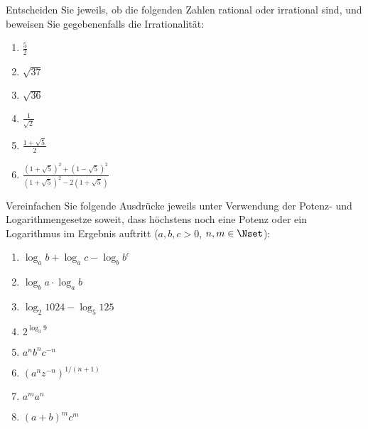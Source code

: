 Entscheiden Sie jeweils, ob die folgenden Zahlen rational oder irrational sind, und beweisen Sie gegebenenfalls die Irrationalität:\\
\parbox{0.5\textwidth}{\begin{enumerate}
\item $\frac{5}{2}$ %
\item $\sqrt{37}$   %
\item $\sqrt{36}$   %
\end{enumerate}}\parbox{0.5\textwidth}{\begin{enumerate}\setcounter{enumi}{3}
\item $\frac{1}{\sqrt{2}}$ %
\item $\frac{1+\sqrt{5}}{2}$ %
\item $\frac{(1+\sqrt{5})^2+(1-\sqrt{5})^2}{(1+\sqrt{5})^2-2(1+\sqrt{5})}$ %
\end{enumerate}}




Vereinfachen Sie folgende Ausdrücke jeweils unter Verwendung der Potenz- und
Logarithmengesetze soweit, dass höchstens noch eine Potenz oder ein Logarithmus im Ergebnis auftritt ($a,b,c>0$, $n,m\in\Nset$):\\
\parbox{0.5\textwidth}{\begin{enumerate}
\item $\log_a b + \log_a c -\log_b b^c$
\item $\log_b a \cdot \log_a b$
\item $\log_2 1024 - \log_5 125$
\item $2^{\log_3 9}$
\end{enumerate}}\parbox{0.5\textwidth}{\begin{enumerate}\setcounter{enumi}{4}
\item $a^n b^n c^{-n}$
\item $(a^n z^{-n})^{1/(n+1)}$
\item $a^m a^n$
\item $(a+b)^m c^m$
\end{enumerate}}


\pagebreak



